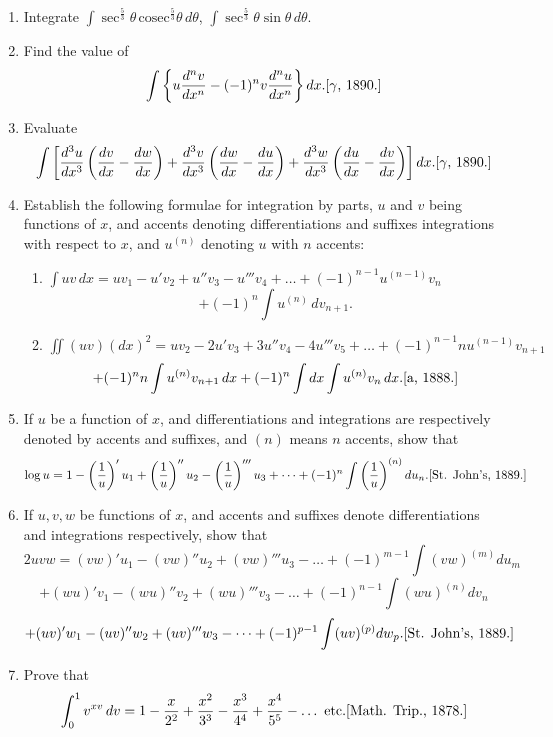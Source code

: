 \documentclass[11pt, a4paper]{article}
\newcommand{\source}[1]{\hfill\textnormal{[#1]}}
\begin{document}
\begin{enumerate}[leftmargin=2em]
\item Integrate $\displaystyle\int \sec^{\frac53}\theta\,\text{cosec}^{\frac53}\theta\,d\theta$, $\displaystyle\int \sec^{\frac53}\theta\sin\theta\,d\theta$.

\item Find the value of
\[
\int \left\{u\dfrac{d^nv}{dx^n}-(-1)^nv\dfrac{d^nu}{dx^n}\right\}dx. \source{$\gamma$, 1890.}
\]

\item Evaluate
\[
\int\left[\dfrac{d^3u}{dx^3}\left(\dfrac{dv}{dx}-\dfrac{dw}{dx}\right)+\dfrac{d^3v}{dx^3}\left(\dfrac{dw}{dx}-\dfrac{du}{dx}\right)+\dfrac{d^3w}{dx^3}\left(\dfrac{du}{dx}-\dfrac{dv}{dx}\right)\right]dx. \source{$\gamma$, 1890.}
\]

\item Establish the following formulae for integration by parts, $u$ and $v$ being functions of $x$, and accents denoting differentiations and suffixes integrations with respect to $x$, and $u^{(n)}$ denoting $u$ with $n$ accents:
\begin{enumerate}[label=(\roman*)]
\item $\displaystyle\int uv\,dx = uv_1-u'v_2+u''v_3-u'''v_4+\dots+(-1)^{n-1}u^{(n-1)}v_n$
\[
+(-1)^n\int u^{(n)}\,dv_{n+1}.
\]
\item $\displaystyle\iint(uv)(dx)^2 = uv_2-2u'v_3+3u''v_4-4u'''v_5+\dots+(-1)^{n-1}nu^{(n-1)}v_{n+1}$
\[
+(-1)^n n\int u^{(n)}v_{n+1}\,dx+(-1)^n\int dx\int u^{(n)}v_n\,dx. \source{a, 1888.}
\]
\end{enumerate}

\item If $u$ be a function of $x$, and differentiations and integrations are respectively denoted by accents and suffixes, and $(n)$ means $n$ accents, show that
\[
\log u = 1-\left(\dfrac{1}{u}\right)'u_1+\left(\dfrac{1}{u}\right)''u_2-\left(\dfrac{1}{u}\right)'''u_3+\dots+(-1)^n\int\left(\dfrac{1}{u}\right)^{(n)}du_n. \source{St. John's, 1889.}
\]

\item If $u,v,w$ be functions of $x$, and accents and suffixes denote differentiations and integrations respectively, show that
\[
2uvw = (vw)'u_1-(vw)''u_2+(vw)'''u_3-\dots+(-1)^{m-1}\int(vw)^{(m)}du_m
\]
\[
+(wu)'v_1-(wu)''v_2+(wu)'''v_3-\dots+(-1)^{n-1}\int(wu)^{(n)}dv_n
\]
\[
+(uv)'w_1-(uv)''w_2+(uv)'''w_3-\dots+(-1)^{p-1}\int(uv)^{(p)}dw_p. \source{St. John's, 1889.}
\]

\item Prove that
\[
\int_0^1 v^{xv}\,dv = 1-\dfrac{x}{2^2}+\dfrac{x^2}{3^3}-\dfrac{x^3}{4^4}+\dfrac{x^4}{5^5}-\dots\ \text{etc.} \source{Math. Trip., 1878.}
\]


\end{enumerate}
\end{document}
